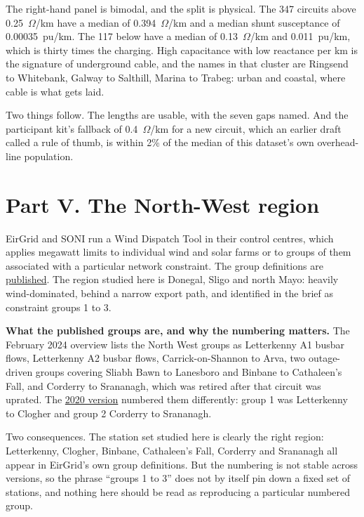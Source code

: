 \documentclass[11pt,a4paper]{article}
\begin{document}
The right-hand panel is bimodal, and the split is physical. The 347 circuits
above 0.25~$\Omega$/km have a median of 0.394~$\Omega$/km and a median shunt
susceptance of 0.00035~pu/km. The 117 below have a median of 0.13~$\Omega$/km
and 0.011~pu/km, which is thirty times the charging. High capacitance with low
reactance per km is the signature of underground cable, and the names in that
cluster are Ringsend to Whitebank, Galway to Salthill, Marina to Trabeg: urban
and coastal, where cable is what gets laid.

Two things follow. The lengths are usable, with the seven gaps named. And the
participant kit's fallback of 0.4~$\Omega$/km for a new circuit, which an
earlier draft called a rule of thumb, is within 2\% of the median of this
dataset's own overhead-line population.

\clearpage
\section{Part V. The North-West region}
\label{sec:northwest}

EirGrid and SONI run a Wind Dispatch Tool in their control centres, which
applies megawatt limits to individual wind and solar farms or to groups of them
associated with a particular network constraint. The group definitions are
\href{https://cms.eirgrid.ie/sites/default/files/publications/Wind-Dispatch-Tool-Constraint-Group-Overview_0.pdf}{published}. The region studied here is Donegal, Sligo
and north Mayo: heavily wind-dominated, behind a narrow export path, and
identified in the brief as constraint groups 1 to 3.

\textbf{What the published groups are, and why the numbering matters.} The
February 2024 overview lists the North West groups as Letterkenny A1 busbar
flows, Letterkenny A2 busbar flows, Carrick-on-Shannon to Arva, two
outage-driven groups covering Sliabh Bawn to Lanesboro and Binbane to
Cathaleen's Fall, and Corderry to Srananagh, which was retired after that
circuit was uprated. The \href{https://www.sem-o.com/sites/semo/files/documents/wind-dispatch-tool-constraint-groups.pdf}{2020 version} numbered them differently: group 1 was
Letterkenny to Clogher and group 2 Corderry to Srananagh.

Two consequences. The station set studied here is clearly the right region:
Letterkenny, Clogher, Binbane, Cathaleen's Fall, Corderry and Srananagh all
appear in EirGrid's own group definitions. But the numbering is not stable
across versions, so the phrase ``groups 1 to 3'' does not by itself pin down a
fixed set of stations, and nothing here should be read as reproducing a
particular numbered group.
\end{document}
